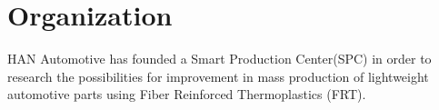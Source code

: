 
\chapter{Organization}

HAN Automotive has founded a Smart Production 
Center(SPC) in order to research the possibilities for improvement in mass 
production of lightweight automotive parts using Fiber Reinforced Thermoplastics 
(FRT).